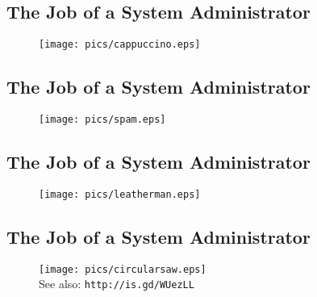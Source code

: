 \documentclass[xga]{xdvislides}
\begin{document}
\subsection{The Job of a System Administrator}
\vspace*{\fill}
\begin{figure}[hb]
	\begin{center}
		\texttt{[image: pics/cappuccino.eps]} \\
	\end{center}
\end{figure}
\vspace*{\fill}

\subsection{The Job of a System Administrator}
\vspace*{\fill}
\begin{figure}[hb]
	\begin{center}
		\texttt{[image: pics/spam.eps]} \\
	\end{center}
\end{figure}
\vspace*{\fill}

\subsection{The Job of a System Administrator}
\vspace*{\fill}
\begin{figure}[hb]
	\begin{center}
		\texttt{[image: pics/leatherman.eps]} \\
	\end{center}
\end{figure}
\vspace*{\fill}

\subsection{The Job of a System Administrator}
\vspace*{\fill}
\begin{figure}[hb]
	\begin{center}
		\texttt{[image: pics/circularsaw.eps]} \\
		\small See also: {\tt http://is.gd/WUezLL} \Normalsize
	\end{center}
\end{figure}
\vspace*{\fill}
\end{document}
